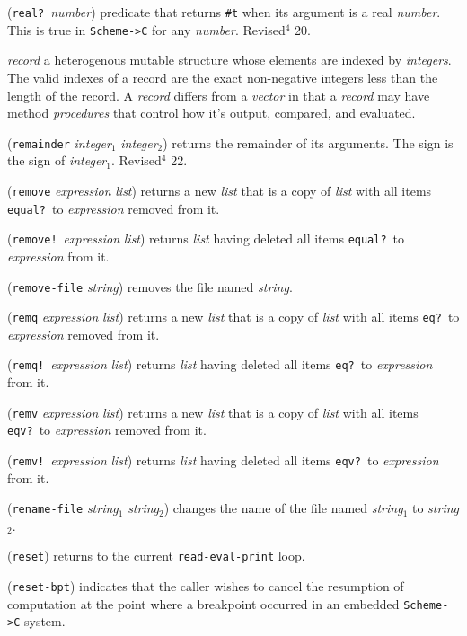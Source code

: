 \documentclass[10pt,twocolumn]{article}
\begin{document}
(\texttt{real?}\ \emph{number}) predicate that returns \texttt{\#t} when its
argument is a real \emph{number}.  This is true in \texttt{Scheme->C} for any
\emph{number}. Revised$^4$ 20.

\emph{record} a heterogenous mutable structure whose elements are
indexed by \emph{integers}.  The valid indexes of a record are
the exact non-negative integers less than the length of the
record. A \emph{record} differs from a \emph{vector} in that a \emph{record} may
have method \emph{procedures} that control how it's output,
compared, and evaluated.

(\texttt{remainder} \emph{integer}$_1$ \emph{integer}$_2$) returns the
remainder of its arguments.  The sign is the sign of
\emph{integer}$_1$. Revised$^4$ 22.

(\texttt{remove} \emph{expression} \emph{list}) returns a new \emph{list} that is a
copy of \emph{list} with all items \texttt{equal?}\ to \emph{expression} removed
from it.

(\texttt{remove!}\ \emph{expression} \emph{list}) returns \emph{list} having deleted
all items \texttt{equal?}\ to \emph{expression} from it.

(\texttt{remove-file} \emph{string}) removes the file named \emph{string}.

(\texttt{remq} \emph{expression} \emph{list}) returns a new \emph{list} that is a
copy of \emph{list} with all items \texttt{eq?}\ to \emph{expression} removed
from it.

(\texttt{remq!}\ \emph{expression} \emph{list}) returns \emph{list} having deleted
all items \texttt{eq?}\ to \emph{expression} from it.

(\texttt{remv} \emph{expression} \emph{list}) returns a new \emph{list} that is a
copy of \emph{list} with all items \texttt{eqv?}\ to \emph{expression} removed
from it.

(\texttt{remv!}\ \emph{expression} \emph{list}) returns \emph{list} having deleted
all items \texttt{eqv?}\ to \emph{expression} from it.

(\texttt{rename-file} \emph{string}$_1$ \emph{string}$_2$) changes the
name of the file named \emph{string}$_1$ to \emph{string}$_2$.

(\texttt{reset}) returns to the current \texttt{read-eval-print} loop.

(\texttt{reset-bpt}) indicates that the caller wishes to cancel the
resumption of computation at the point where a breakpoint occurred in
an embedded \texttt{Scheme->C} system.
\end{document}
